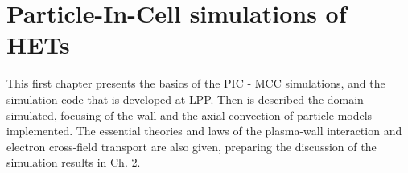 
\chapter{Particle-In-Cell simulations of HETs}
\label{ch-1}

\begin{Chabstract}
  
This first chapter presents the basics of the \ac{PIC} - \ac{MCC} simulations, and the simulation code \LPPic that is developed at \ac{LPP}.
Then is described the domain simulated, focusing of the wall and the axial convection of particle models implemented.
The essential theories and laws of the plasma-wall interaction and electron cross-field transport are also given, preparing the discussion of the simulation results in Ch. 2.

\end{Chabstract}

\minitoc


 












